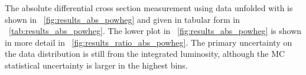 


The absolute differential cross section measurement using data unfolded with
\POWHEG is shown in \FIG~\ref{fig:results_abs_powheg} and given in tabular form
in \TAB~\ref{tab:results_abs_powheg}. The lower plot in
\FIG~\ref{fig:results_abs_powheg} is shown in more detail in
\FIG~\ref{fig:results_ratio_abs_powheg}. The primary uncertainty on the data
distribution is still from the integrated luminosity, although the MC
statistical uncertainty is larger in the highest \phistar bins.




